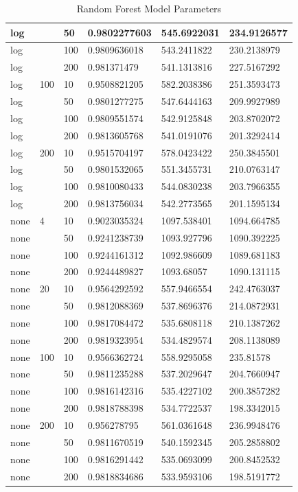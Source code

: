\documentclass[11pt,letterpaper]{article}
\begin{document}
\begin{table}[!ht]
\begin{tabular}{|l|l|l|l|l|l|}
        log & ~ & 50 & 0.9802277603 & 545.6922031 & 234.9126577 \\ \hline
        log & ~ & 100 & 0.9809636018 & 543.2411822 & 230.2138979 \\ \hline
        log & ~ & 200 & 0.981371479 & 541.1313816 & 227.5167292 \\ \hline
        log & 100 & 10 & 0.9508821205 & 582.2038386 & 251.3593473 \\ \hline
        log & ~ & 50 & 0.9801277275 & 547.6444163 & 209.9927989 \\ \hline
        log & ~ & 100 & 0.9809551574 & 542.9125848 & 203.8702072 \\ \hline
        log & ~ & 200 & 0.9813605768 & 541.0191076 & 201.3292414 \\ \hline
        log & 200 & 10 & 0.9515704197 & 578.0423422 & 250.3845501 \\ \hline
        log & ~ & 50 & 0.9801532065 & 551.3455731 & 210.0763147 \\ \hline
        log & ~ & 100 & 0.9810080433 & 544.0830238 & 203.7966355 \\ \hline
        log & ~ & 200 & 0.9813756034 & 542.2773565 & 201.1595134 \\ \hline
        none & 4 & 10 & 0.9023035324 & 1097.538401 & 1094.664785 \\ \hline
        none & ~ & 50 & 0.9241238739 & 1093.927796 & 1090.392225 \\ \hline
        none & ~ & 100 & 0.9244161312 & 1092.986609 & 1089.681183 \\ \hline
        none & ~ & 200 & 0.9244489827 & 1093.68057 & 1090.131115 \\ \hline
        none & 20 & 10 & 0.9564292592 & 557.9466554 & 242.4763037 \\ \hline
        none & ~ & 50 & 0.9812088369 & 537.8696376 & 214.0872931 \\ \hline
        none & ~ & 100 & 0.9817084472 & 535.6808118 & 210.1387262 \\ \hline
        none & ~ & 200 & 0.9819323954 & 534.4829574 & 208.1138089 \\ \hline
        none & 100 & 10 & 0.9566362724 & 558.9295058 & 235.81578 \\ \hline
        none & ~ & 50 & 0.9811235288 & 537.2029647 & 204.7660947 \\ \hline
        none & ~ & 100 & 0.9816142316 & 535.4227102 & 200.3857282 \\ \hline
        none & ~ & 200 & 0.9818788398 & 534.7722537 & 198.3342015 \\ \hline
        none & 200 & 10 & 0.956278795 & 561.0361648 & 236.9948476 \\ \hline
        none & ~ & 50 & 0.9811670519 & 540.1592345 & 205.2858802 \\ \hline
        none & ~ & 100 & 0.9816291442 & 535.0693099 & 200.8452532 \\ \hline
        none & ~ & 200 & 0.9818834686 & 533.9593106 & 198.5191772 \\ \hline
    \end{tabular}
    \caption {Random Forest Model Parameters}
\end{table}
\end{document}

